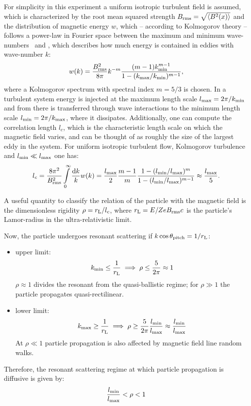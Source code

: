 For simplicity in this experiment a uniform isotropic turbulent field is
assumed, which is characterized by the root mean squared strength
$B_{\mathrm{rms}}=\sqrt{\langle{B^2(x)}\rangle}$ and the distribution of magnetic energy
$w$, which -- according to Kolmogorov theory -- follows a power-law in Fourier
space between the maximum and minimum wave-numbers \kmin~and \kmax, which
describes how much energy is contained in eddies with wave-number $k$:
\begin{equation}
    w(k)=\frac{B_{\mathrm{rms}}^2}{8\pi}k^{-m}\frac{(m-1)k_{\mathrm{min}}^{m-1}}{1-(k_{\mathrm{max}}/k_{\mathrm{min}})^{m-1}},
\end{equation}
where a Kolmogorov spectrum with spectral index $m=5/3$ is chosen.
In a turbulent system energy is injected at the maximum length scale
$l_{\mathrm{max}}=2\pi/k_{\mathrm{min}}$ and from there is transferred through wave interactions to
the minimum length scale $l_{\mathrm{min}}=2\pi/k_{\mathrm{max}}$, where it dissipates.
Additionally, one can compute the correlation length $l_c$, which is the
characteristic length scale on which the magnetic field varies, and can be
thought of as roughly the size of the largest eddy in the system. For uniform
isotropic turbulent flow, Kolmogorov turbulence and $l_{\mathrm{min}}\ll l_{\mathrm{max}}$ one has:
\begin{equation}
    l_c=\frac{8\pi^2}{B_{\mathrm{rms}}^2}\int\limits_{0}^{\infty}\frac{\dd{k}}{k}w(k)
    =\frac{l_{\mathrm{max}}}{2}\frac{m-1}{m}\frac{1-(l_{\mathrm{min}}/l_{\mathrm{max}})^m}{1-(l_{\mathrm{min}}/l_{\mathrm{max}})^{m-1}}
    \approx\frac{l_{\mathrm{max}}}{5}.
\end{equation}

A useful quantity to classify the relation of the particle with the magnetic
field is the dimensionless rigidity $\rho=r_{\mathrm{L}}/l_c$, where $r_{\mathrm{L}}=E/ZeB_{\mathrm{rms}}
c$ is the particle's Lamor-radius in the ultra-relativistic limit.

Now, the particle undergoes resonant scattering if $k\cos\theta_{\mathrm{pitch}}=1/r_{\mathrm{L}}$:
\begin{itemize}
    \item upper limit:
        \[k_{\mathrm{min}}\le\frac{1}{r_{\mathrm{L}}} \implies \rho\le\frac{5}{2\pi}\approx1\]
        $\rho\approx1$ divides the resonant from the quasi-ballistic regime; for
        $\rho\gg1$ the particle propagates quasi-rectilinear.
    \item lower limit:
        \[k_{\mathrm{max}}\ge\frac{1}{r_{\mathrm{L}}} \implies
            \rho\ge\frac{5}{2\pi}\frac{l_{\mathrm{min}}}{l_{\mathrm{max}}}\approx\frac{l_{\mathrm{min}}}{l_{\mathrm{max}}}\]
        At $\rho\ll1$ particle propagation is also affected by magnetic field
        line random walks.
\end{itemize}
Therefore, the resonant scattering regime at which particle propagation is
diffusive is given by:
\begin{equation}
    \frac{l_{\mathrm{min}}}{l_{\mathrm{max}}}<\rho<1
    \label{eq:resontant-scattering}
\end{equation}


